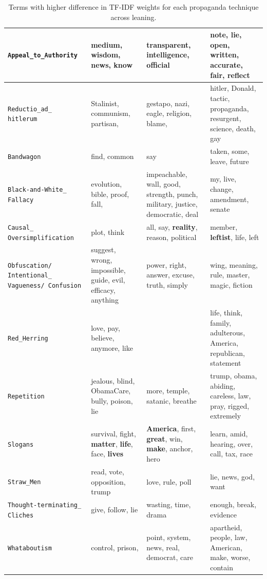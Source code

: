 \begin{table}[!htbp]
{\begin{tabular}{p{}|p{}|p{}|p{}}
         \hline
         \texttt{Appeal\_to\_Authority} & medium, wisdom, \textbf{news}, know  & transparent, \textbf{intelligence}, official  & \textbf{note}, lie, open, \textbf{written}, accurate, fair, reflect   \\
         \hline
         \texttt{Reductio\_ad\_ hitlerum} & Stalinist, communism, partisan, & gestapo, nazi, eagle, religion, blame,   & hitler, Donald, tactic, propaganda, resurgent, science, death, gay \\
         \hline
         \texttt{Bandwagon} & find, common & say & taken, some, leave, future \\
         \hline
         \texttt{Black-and-White\_ Fallacy} & evolution, bible, proof, fall,  & impeachable, wall, good, strength, punch, military, justice, democratic, deal & my, live, change, amendment, senate \\
         \hline
         \texttt{Causal\_ Oversimplification} & plot, think & all, say, \textbf{reality}, reason, political & member, \textbf{leftist}, life, left  \\
         \hline
         \texttt{Obfuscation/ Intentional\_ Vagueness/ Confusion} & suggest, wrong, impossible, guide, evil, efficacy, anything & power, right, answer, excuse, truth, simply  & wing, meaning, rule, master, magic, fiction \\
         \hline
         \texttt{Red\_Herring} & love, pay, believe, anymore, like & & life, think, family, adulterous, America, republican, statement  \\
         \hline
         \texttt{Repetition} & jealous, blind, ObamaCare, bully, poison, lie  & more, temple, satanic, breathe & trump, obama, abiding, careless, law, pray, rigged, extremely  \\
         \hline
         \texttt{Slogans} & survival, fight, \textbf{matter}, \textbf{life}, face, \textbf{lives} & \textbf{America}, first, \textbf{great}, win, \textbf{make}, anchor, hero  & learn, amid, hearing, over, call, tax, race  \\
         \hline
         \texttt{Straw\_Men} & read, vote, opposition, trump & love, rule, poll & lie, news, god, want \\
         \hline
         \texttt{Thought-terminating\_ Cliches} & give, follow, lie  & wasting, time, drama & enough, break, evidence \\
         \hline
         \texttt{Whataboutism} & control, prison, & point, system, news, real, democrat, care  & apartheid, people, law, American, make, worse, contain \\
    \end{tabular}
}
    \caption{Terms with higher difference in TF-IDF weights for each propaganda technique across leaning.}
    \label{tab:prop_words_by_technique_and_leaning}
\end{table}

